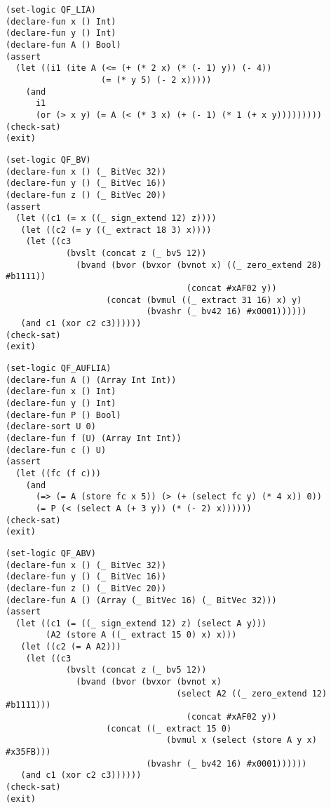 \documentclass[12pt]{article}
\begin{document}
{\footnotesize
\begin{verbatim}
(set-logic QF_LIA)
(declare-fun x () Int)
(declare-fun y () Int)
(declare-fun A () Bool)
(assert
  (let ((i1 (ite A (<= (+ (* 2 x) (* (- 1) y)) (- 4))
                   (= (* y 5) (- 2 x)))))
    (and
      i1
      (or (> x y) (= A (< (* 3 x) (+ (- 1) (* 1 (+ x y)))))))))
(check-sat)
(exit)
\end{verbatim}}



{\footnotesize
\begin{verbatim}
(set-logic QF_BV)
(declare-fun x () (_ BitVec 32))
(declare-fun y () (_ BitVec 16))
(declare-fun z () (_ BitVec 20))
(assert
  (let ((c1 (= x ((_ sign_extend 12) z))))
   (let ((c2 (= y ((_ extract 18 3) x))))
    (let ((c3 
            (bvslt (concat z (_ bv5 12)) 
              (bvand (bvor (bvxor (bvnot x) ((_ zero_extend 28) #b1111)) 
                                    (concat #xAF02 y))
                    (concat (bvmul ((_ extract 31 16) x) y) 
                            (bvashr (_ bv42 16) #x0001))))))
   (and c1 (xor c2 c3))))))
(check-sat)
(exit)
\end{verbatim}}



{\footnotesize
\begin{verbatim}
(set-logic QF_AUFLIA)
(declare-fun A () (Array Int Int))
(declare-fun x () Int)
(declare-fun y () Int)
(declare-fun P () Bool)
(declare-sort U 0)
(declare-fun f (U) (Array Int Int))
(declare-fun c () U)
(assert
  (let ((fc (f c)))
    (and
      (=> (= A (store fc x 5)) (> (+ (select fc y) (* 4 x)) 0))
      (= P (< (select A (+ 3 y)) (* (- 2) x))))))
(check-sat)
(exit)
\end{verbatim}}



\footnotesize
\begin{verbatim}
(set-logic QF_ABV)
(declare-fun x () (_ BitVec 32))
(declare-fun y () (_ BitVec 16))
(declare-fun z () (_ BitVec 20))
(declare-fun A () (Array (_ BitVec 16) (_ BitVec 32)))
(assert
  (let ((c1 (= ((_ sign_extend 12) z) (select A y)))
        (A2 (store A ((_ extract 15 0) x) x)))
   (let ((c2 (= A A2)))
    (let ((c3 
            (bvslt (concat z (_ bv5 12)) 
              (bvand (bvor (bvxor (bvnot x) 
                                  (select A2 ((_ zero_extend 12) #b1111)))
                                    (concat #xAF02 y))
                    (concat ((_ extract 15 0) 
                                (bvmul x (select (store A y x) #x35FB))) 
                            (bvashr (_ bv42 16) #x0001))))))
   (and c1 (xor c2 c3))))))
(check-sat)
(exit)
\end{verbatim}
\end{document}
